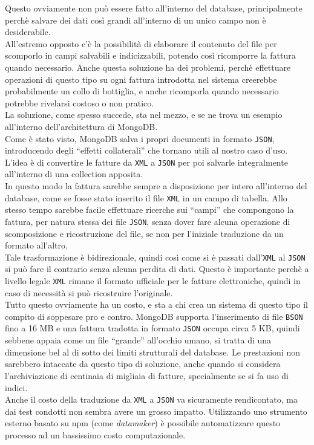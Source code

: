 \noindent Questo ovviamente non può essere fatto all'interno del database, principalmente perchè salvare dei dati così grandi all'interno di un unico campo non è desiderabile.\\
All'estremo opposto c'è la possibilità di elaborare il contenuto del file per scomporlo in campi salvabili e indicizzabili, potendo così ricomporre la fattura quando necessario. Anche questa soluzione ha dei problemi, perchè effettuare operazioni di questo tipo su ogni fattura introdotta nel sistema creerebbe probabilmente un collo di bottiglia, e anche ricomporla quando necessario potrebbe rivelarsi costoso o non pratico.\\

\noindent La soluzione, come spesso succede, sta nel mezzo, e se ne trova un esempio all'interno dell'architettura di MongoDB.\\
Come è stato visto, MongoDB salva i propri documenti in formato \texttt{JSON}, introducendo degli ``effetti collaterali'' che tornano utili al nostro caso d'uso.\\
L'idea è di convertire le fatture da \texttt{XML} a \texttt{JSON} per poi salvarle integralmente all'interno di una collection apposita.\\
In questo modo la fattura sarebbe sempre a disposizione per intero all'interno del database, come se fosse stato inserito il file \texttt{XML} in un campo di tabella. Allo stesso tempo sarebbe facile effettuare ricerche sui ``campi'' che compongono la fattura, per natura stessa dei file \texttt{JSON}, senza dover fare alcuna operazione di scomposizione e ricostruzione del file, se non per l'iniziale traduzione da un formato all'altro.\\

\noindent Tale trasformazione è bidirezionale, quindi così come si è passati dall'\texttt{XML} al \texttt{JSON} si può fare il contrario senza alcuna perdita di dati. Questo è importante perchè a livello legale \texttt{XML} rimane il formato ufficiale per le fatture elettroniche, quindi in caso di necessità si può ricostruire l'originale.\\

\noindent Tutto questo ovviamente ha un costo, e sta a chi crea un sistema di questo tipo il compito di soppesare pro e contro. MongoDB supporta l'inserimento di file \texttt{BSON} fino a 16 MB e una fattura tradotta in formato \texttt{JSON} occupa circa 5 KB, quindi sebbene appaia come un file ``grande'' all'occhio umano, si tratta di una dimensione bel al di sotto dei limiti strutturali del database. Le prestazioni non sarebbero intaccate da questo tipo di soluzione, anche quando si considera l'archiviazione di centinaia di migliaia di fatture, specialmente se si fa uso di indici.\\
Anche il costo della traduzione da \texttt{XML} a \texttt{JSON} va sicuramente rendicontato, ma dai test condotti non sembra avere un grosso impatto. Utilizzando uno strumento esterno basato su \gls{npm} (come \textit{datamaker}) è possibile automatizzare questo processo ad un bassissimo costo computazionale.\\


